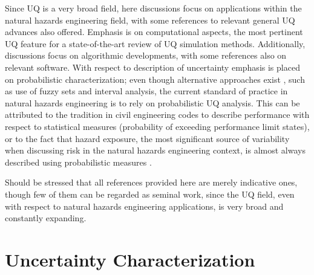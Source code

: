 Since UQ is a very broad field, here discussions focus on applications within the natural hazards engineering field, with some references to relevant general UQ advances also offered. Emphasis is on computational aspects, the most pertinent UQ feature for a state-of-the-art review of UQ simulation methods. Additionally, discussions focus on algorithmic developments, with some references also on relevant software. With respect to description of uncertainty emphasis is placed on probabilistic characterization; even though alternative approaches exist \citep{beer2013imprecise}, such as use of fuzzy sets and interval analysis, the current standard of practice in natural hazards engineering is to rely on probabilistic UQ analysis. This can be attributed to the tradition in civil engineering codes to describe performance with respect to statistical measures (probability of exceeding performance limit states), or to the fact that hazard exposure, the most significant source of variability when discussing risk in the natural hazards engineering context, is almost always described using probabilistic measures \citep{mcguire2004seismic, resio2007white}. 

Should be stressed that all references provided here are merely indicative ones, though few of them can be regarded as seminal work, since the UQ field, even with respect to natural hazards engineering applications, is very broad and constantly expanding.    

\section{Uncertainty Characterization}
\label{sec:uq_characterization}

